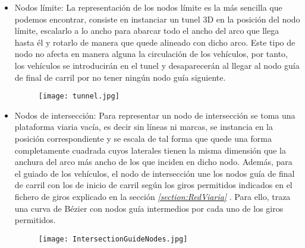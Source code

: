 	\begin{itemize}
	\item Nodos límite:
	\newline
	La representación de los nodos límite es la más sencilla que podemos encontrar, consiste en instanciar un tunel 3D en la posición del nodo límite, escalarlo a lo ancho para abarcar todo el ancho del arco que llega hasta él y rotarlo de manera que quede alineado con dicho arco.
	\newline
	\newline
	Este tipo de nodo no afecta en manera alguna la circulación de los vehículos, por tanto, los vehículos se introducirán en el tunel y desaparecerán al llegar al nodo guía de final de carril por no tener ningún nodo guía siguiente.
	
	\begin{figure}[H]
		\centering
			\texttt{[image: tunnel.jpg]}
	\end{figure}
	
	\item Nodos de intersección:
	\newline
	Para representar un nodo de intersección se toma una plataforma viaria vacía, es decir sin líneas ni marcas, se instancia en la posición correspondiente y se escala de tal forma que quede una forma completamente cuadrada cuyos laterales tienen la misma dimensión que la anchura del arco más ancho de los que inciden en dicho nodo.
	\newline
	\newline
	Además, para el guiado de los vehículos, el nodo de intersección une los nodos guía de final de carril con los de inicio de carril según los giros permitidos indicados en el fichero de giros explicado en la sección \emph{\ref{section:RedViaria} }. Para ello, traza una curva de Bézier \cite{BezierCurves} con nodos guía intermedios por cada uno de los giros permitidos.
	
	\begin{figure}[H]
		\centering
			\texttt{[image: IntersectionGuideNodes.jpg]}
	\end{figure}
	

\end{itemize}
